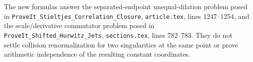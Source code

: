 The new formulas answer the separated-endpoint unequal-dilation problem
posed in \nolinkurl{ProveIt_Stieltjes_Correlation_Closure},
\texttt{article.tex}, lines 1247--1254, and the scale/derivative commutator
problem posed in \nolinkurl{ProveIt_Shifted_Hurwitz_Jets},
\texttt{sections.tex}, lines 782--783. They do not settle collision
renormalization for two singularities at the same point or prove
arithmetic independence of the resulting constant coordinates.
